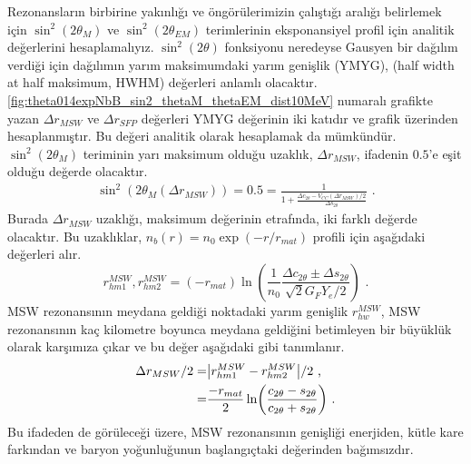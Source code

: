 Rezonansların birbirine yakınlığı ve öngörülerimizin çalıştığı aralığı belirlemek için $ \sin^{2}(2\theta_{M}) $ ve $ \sin^{2}(2\theta_{EM}) $ terimlerinin eksponansiyel profil için analitik değerlerini hesaplamalıyız. $ \sin^{2}(2\theta) $ fonksiyonu neredeyse Gausyen bir dağılım verdiği için dağılımın yarım maksimumdaki yarım genişlik (YMYG), (half width at half maksimum, HWHM) değerleri anlamlı olacaktır. \ref{fig:theta014expNbB_sin2_thetaM_thetaEM_dist10MeV} numaralı grafikte yazan $ \Delta r_{MSW} $ ve $ \Delta r_{SFP} $ değerleri YMYG değerinin iki katıdır ve grafik üzerinden hesaplanmıştır. Bu değeri analitik olarak hesaplamak da mümkündür. $\sin^{2}(2\theta_{M}) $ teriminin yarı maksimum olduğu uzaklık, $\Delta r_{MSW}$, ifadenin $ 0.5 $'e eşit olduğu değerde olacaktır.
\begin{align}
    \sin^{2}(2\theta_{M}(\Delta r_{MSW}) ) = 0.5 = \frac{1}{1+\frac{\Delta c_{2\theta} - V_{CC}(\Delta r_{MSW})/2}{\Delta s_{2\theta}}} \text{ .}
\end{align}
Burada $ \Delta r_{MSW} $ uzaklığı, maksimum değerinin etrafında, iki farklı değerde olacaktır. Bu uzaklıklar, $ n_{b}(r) = n_{0}\exp(-r/r_{mat}) $ profili için aşağıdaki değerleri alır.
\begin{equation}
    r^{MSW}_{hm1}, r^{MSW}_{hm2} = (-r_{mat})\ln(\frac{1}{n_{0}}\frac{\Delta c_{2\theta} \pm \Delta s_{2\theta}}{\sqrt{2} G_{F} Y_{e}/2}) \text{ .}
\end{equation}
MSW rezonansının meydana geldiği noktadaki yarım genişlik $ r^{MSW}_{hw} $, MSW rezonansının kaç kilometre boyunca meydana geldiğini betimleyen bir büyüklük olarak karşımıza çıkar ve bu değer aşağıdaki gibi tanımlanır.
\begin{align} \label{eqn:rMSW_hw}
    \nonumber \Delta r_{MSW}/2 =& \abs{r^{MSW}_{hm1}- r^{MSW}_{hm2}}/2 \text{ ,}\\
    =& \frac{-r_{mat}}{2} \ln(\frac{c_{2\theta} - s_{2\theta}}{c_{2\theta} + s_{2\theta}}) \text{ .}
\end{align}
Bu ifadeden de görüleceği üzere, MSW rezonansının genişliği enerjiden, kütle kare farkından ve baryon yoğunluğunun başlangıçtaki değerinden bağımsızdır. 

